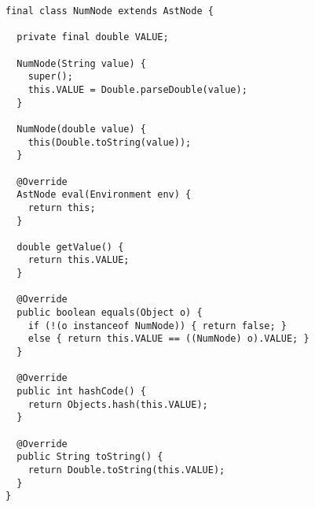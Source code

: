 





\begin{lstlisting}[language=MyJava]
final class NumNode extends AstNode {

  private final double VALUE;

  NumNode(String value) {
    super();
    this.VALUE = Double.parseDouble(value);
  }

  NumNode(double value) { 
    this(Double.toString(value)); 
  }

  @Override
  AstNode eval(Environment env) { 
    return this;
  }

  double getValue() {
    return this.VALUE;
  }

  @Override
  public boolean equals(Object o) {
    if (!(o instanceof NumNode)) { return false; }
    else { return this.VALUE == ((NumNode) o).VALUE; }
  }

  @Override
  public int hashCode() {
    return Objects.hash(this.VALUE);
  }

  @Override
  public String toString() { 
    return Double.toString(this.VALUE); 
  }
}
\end{lstlisting}

